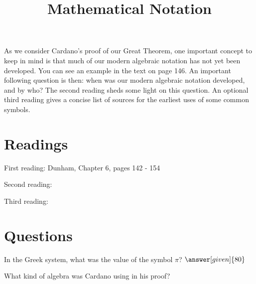 \documentclass[nooutcomes]{ximera}
\title{Mathematical Notation}
\begin{document}
\begin{abstract}
    
\end{abstract}
\maketitle

As we consider Cardano's proof of our Great Theorem, one important concept to keep in mind is that much of our modern 
algebraic notation has not yet been developed.  You can see an example in the text on page 146.  An important 
following question is then: when was our modern algebraic notation developed, and by who?  The second reading sheds 
some light on this question.  An optional third reading gives a concise list of sources for the earliest uses of some 
common symbols.


\section{Readings}
First reading: Dunham, Chapter 6, pages 142 - 154

Second reading: 

Third reading: 

\section{Questions}

\begin{question}
In the Greek system, what was the value of the symbol $\pi$? $\answer[given]{80}$
\end{question}

\begin{question}
What kind of algebra was Cardano using in his proof?
\begin{multipleChoice}
\end{multipleChoice}
\end{question}

%
%
\end{document}
